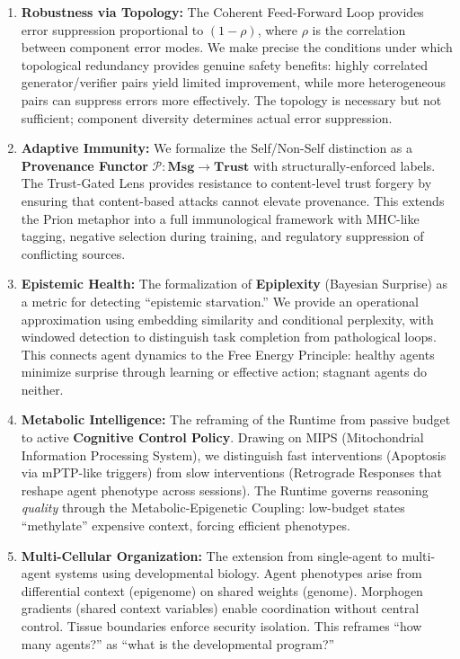 \begin{enumerate}[leftmargin=*]
\item \textbf{Robustness via Topology:} The Coherent Feed-Forward Loop provides error suppression proportional
to $(1-\rho)$, where $\rho$ is the correlation between component error modes. We make precise the conditions
under which topological redundancy provides genuine safety benefits: highly correlated generator/verifier
pairs yield limited improvement, while more heterogeneous pairs can suppress errors more effectively. The
topology is necessary but not sufficient; component diversity determines actual error suppression.

\item \textbf{Adaptive Immunity:} We formalize the Self/Non-Self distinction as a \textbf{Provenance Functor}
$\mathcal{P}: \mathbf{Msg} \to \mathbf{Trust}$ with structurally-enforced labels. The Trust-Gated Lens
provides resistance to content-level trust forgery by ensuring that content-based attacks cannot elevate provenance. This extends
the Prion metaphor into a full immunological framework with MHC-like tagging, negative selection during
training, and regulatory suppression of conflicting sources.

\item \textbf{Epistemic Health:} The formalization of \textbf{Epiplexity} (Bayesian Surprise) as a metric for
detecting ``epistemic starvation.'' We provide an operational approximation using embedding similarity and
conditional perplexity, with windowed detection to distinguish task completion from pathological loops.
This connects agent dynamics to the Free Energy Principle: healthy agents minimize surprise through learning
or effective action; stagnant agents do neither.

\item \textbf{Metabolic Intelligence:} The reframing of the Runtime from passive budget to active
\textbf{Cognitive Control Policy}. Drawing on MIPS (Mitochondrial Information Processing System), we
distinguish fast interventions (Apoptosis via mPTP-like triggers) from slow interventions (Retrograde
Responses that reshape agent phenotype across sessions). The Runtime governs reasoning \textit{quality}
through the Metabolic-Epigenetic Coupling: low-budget states ``methylate'' expensive context, forcing
efficient phenotypes.

\item \textbf{Multi-Cellular Organization:} The extension from single-agent to multi-agent systems using
developmental biology. Agent phenotypes arise from differential context (epigenome) on shared weights (genome).
Morphogen gradients (shared context variables) enable coordination without central control. Tissue boundaries
enforce security isolation. This reframes ``how many agents?'' as ``what is the developmental program?''


\end{enumerate}
